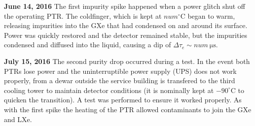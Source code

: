 \textbf{June 14, 2016}  The first impurity spike happened when a power glitch shut off the operating PTR.  The coldfinger,
which is kept at $num^{\circ} \mathrm{C}$ began to warm, releasing impurities into the GXe that had condensed on and around its
surface.  Power was quickly restored and the detector remained stable, but the impurities condensed and diffused into the liquid,
causing a dip of $\Delta \tau_e \sim num\ \mathrm{\mu s}$.

\textbf{July 15, 2016}  The second purity drop occurred during a \lntwo test.  In the event both PTRs lose power and the uninterruptible
power supply
(UPS) does not work properly, \lntwo from a dewar outside the service building is transfered to the third cooling tower to maintain
detector conditions (it is nominally kept at $-90^{\circ}\mathrm{C}$ to quicken the transition).  A test was performed to ensure it
worked properly.  As with the first spike the heating of the PTR allowed contaminants to join the GXe and LXe.

\begin{table}
\centering
{}
\caption{Purity drops over the lifetime of XENON1T.  Dates and expected causes are given, along with detector region (GXe or LXe) impurity
release is thought to occur.  Possible causes and the change in $\tau_e$ from $\alpha$ measurements are given.}
\label{tab:electron_lifetime_model_detector_effects_spikes_dates}
\end{table}


